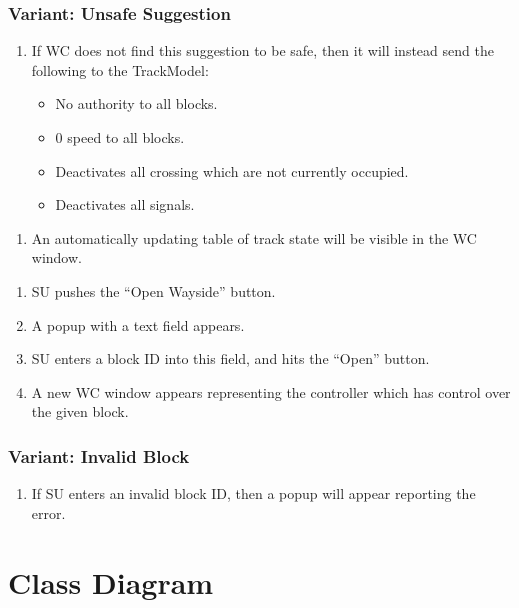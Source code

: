 \documentclass{scrreprt}
\begin{document}
    \subsubsection{Variant: Unsafe Suggestion}
    \begin{enumerate}[label=\arabic*a., start=4]
        \item If WC does not find this suggestion to be safe, then it will instead send the following to the TrackModel:
            \begin{itemize}
                \item No authority to all blocks.
                \item 0 speed to all blocks.
                \item Deactivates all crossing which are not currently occupied.
                \item Deactivates all signals.
            \end{itemize}
    \end{enumerate}

    \begin{enumerate}
        \item An automatically updating table of track state will be visible in the WC window.
    \end{enumerate}

    \begin{enumerate}
        \item SU pushes the ``Open Wayside'' button.
        \item A popup with a text field appears.
        \item SU enters a block ID into this field, and hits the ``Open'' button.
        \item A new WC window appears representing the controller which has control over the given block.
    \end{enumerate}
    \subsubsection{Variant: Invalid Block}
    \begin{enumerate}[label = \arabic*a., start = 4]
        \item If SU enters an invalid block ID, then a popup will appear reporting the error.
    \end{enumerate}

    \section{Class Diagram}
    
\end{document}
